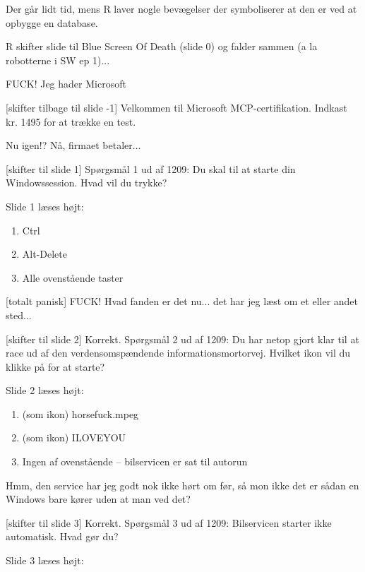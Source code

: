 \documentclass[danish]{article}
\begin{document}
\begin{sketch}
\scene Der går lidt tid, mens R laver nogle bevægelser der symboliserer at den
er ved at opbygge en database.

\scene R skifter slide til Blue Screen Of Death (slide 0) og falder sammen (a la
robotterne i SW ep 1)...

 FUCK! Jeg hader Microsoft 

[skifter tilbage til slide -1] Velkommen til Microsoft MCP-certifikation.
Indkast kr. 1495 for at trække en test.

  Nu igen!? Nå, firmaet betaler... 

[skifter til slide 1] Spørgsmål 1 ud af 1209: Du skal til at starte din
Windowssession. Hvad vil du trykke? 

\scene Slide 1 læses højt:

\begin{enumerate}
\item   Ctrl
\item   Alt-Delete
\item   Alle ovenstående taster
\end{enumerate}

[totalt panisk] FUCK! Hvad fanden er det nu... det har jeg læst om et
eller andet sted... 

[skifter til slide 2] Korrekt. Spørgsmål 2 ud af 1209: Du har netop
gjort klar til at race ud af den verdensomspændende informationsmortorvej.
Hvilket ikon vil du klikke på for at starte? 

\scene Slide 2 læses højt:

\begin{enumerate}
\item (som ikon) horsefuck.mpeg
\item (som ikon) ILOVEYOU
\item Ingen af ovenstående -- bilservicen er sat til autorun
\end{enumerate}

 Hmm, den service har jeg godt nok ikke hørt om før, så mon ikke det er
sådan en Windows bare kører uden at man ved det? 

[skifter til slide 3] Korrekt. Spørgsmål 3 ud af 1209: Bilservicen
starter ikke automatisk. Hvad gør du? 

\scene Slide 3 læses højt:


\end{sketch}
\end{document}

